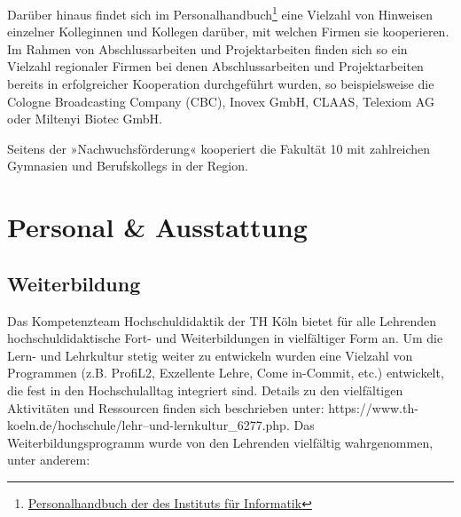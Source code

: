 Darüber hinaus findet sich im Personalhandbuch\footnote{\href{http://bit.ly/2mpcbWN}{Personalhandbuch
  der des Instituts für Informatik}} eine Vielzahl von Hinweisen
einzelner Kolleginnen und Kollegen darüber, mit welchen Firmen sie
kooperieren. Im Rahmen von Abschlussarbeiten und Projektarbeiten finden
sich so ein Vielzahl regionaler Firmen bei denen Abschlussarbeiten und
Projektarbeiten bereits in erfolgreicher Kooperation durchgeführt
wurden, so beispielsweise die Cologne Broadcasting Company (CBC), Inovex
GmbH, CLAAS, Telexiom AG oder Miltenyi Biotec GmbH.

Seitens der »Nachwuchsförderung« kooperiert die Fakultät 10 mit
zahlreichen Gymnasien und Berufskollegs in der Region.

\chapter{Personal \& Ausstattung}\label{personal-ausstattung}

\section{Weiterbildung}\label{weiterbildung}

Das Kompetenzteam Hochschuldidaktik der TH Köln bietet für alle
Lehrenden hochschuldidaktische Fort- und Weiterbildungen in vielfältiger
Form an. Um die Lern- und Lehrkultur stetig weiter zu entwickeln wurden
eine Vielzahl von Programmen (z.B. ProfiL2, Exzellente Lehre, Come
in-Commit, etc.) entwickelt, die fest in den Hochschulalltag integriert
sind. Details zu den vielfältigen Aktivitäten und Ressourcen finden sich
beschrieben unter:
https://www.th-koeln.de/hochschule/lehr--und-lernkultur\_6277.php. Das
Weiterbildungsprogramm wurde von den Lehrenden vielfältig wahrgenommen,
unter anderem:

